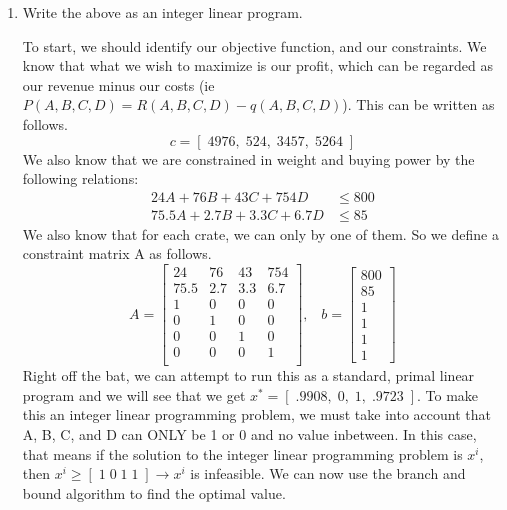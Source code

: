 \documentclass[11pt]{article}
\begin{document}
\begin{enumerate}
    \begin{enumerate}
    \item Write the above as an integer linear program.

        To start, we should identify our objective function, and our
        constraints. We know that what we wish to maximize is our profit, which
        can be regarded as our revenue minus our costs (ie $P(A, B, C, D) =
        R(A, B, C, D) - q(A, B, C, D)$). This can be written as follows.
        \[
            c = [\; 4976,\; 524,\; 3457,\; 5264\; ]
        \]
        We also know that we are constrained in weight and buying power by the
        following relations:
        \begin{align*}
            24A + 76B + 43C + 754D &\leq 800 \\
            75.5A + 2.7B + 3.3C + 6.7D &\leq 85
        \end{align*}
        We also know that for each crate, we can only by one of them. So we
        define a constraint matrix A as follows.
        \[
            A = \begin{bmatrix}
                    24      &       76      &       43      &       754 \\
                    75.5    &       2.7     &       3.3     &       6.7 \\
                    1       &       0       &       0       &       0   \\
                    0       &       1       &       0       &       0   \\
                    0       &       0       &       1       &       0   \\
                    0       &       0       &       0       &       1   \\
                \end{bmatrix},\;\;\;
            b = \begin{bmatrix}
                    800 \\  85  \\  1  \\  1  \\  1  \\  1
                \end{bmatrix}
        \]
        Right off the bat, we can attempt to run this as a standard, primal
        linear program and we will see that we get $x^* =
        [\;.9908,\;0,\;1,\;.9723\;]$. To make this an integer linear
        programming problem, we must take into account that A, B, C, and D can
        ONLY be 1 or 0 and no value inbetween. In this case, that means if the
        solution to the integer linear programming problem is $x^i$, then $x^i
        \geq [\;1\;0\;1\;1\;] \longrightarrow {x^i }$ is infeasible. We can now
        use the branch and bound algorithm to find the optimal value.


\end{enumerate}
\end{enumerate}
\end{document}
